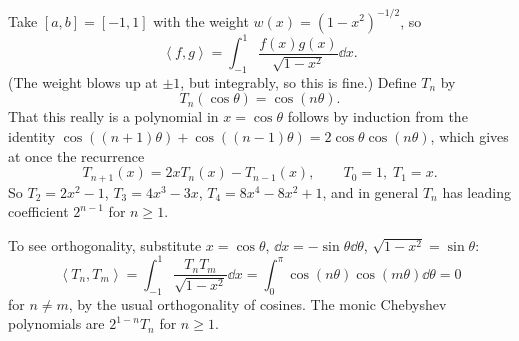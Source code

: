 \documentclass[a4paper]{scrartcl}
\newcommand{\ip}[2]{\left\langle #1, #2 \right\rangle}
\begin{document}
\begin{example}
  Take $[a,b] = [-1,1]$ with the weight $w(x) = (1-x^2)^{-1/2}$, so
  $$
  \ip{f}{g} = \int_{-1}^{1}\frac{f(x)g(x)}{\sqrt{1-x^2}}\dd x.
  $$
  (The weight blows up at $\pm 1$, but integrably, so this is fine.) Define $T_n$ by
  $$
  T_n(\cos\theta) = \cos(n\theta).
  $$
  That this really is a polynomial in $x = \cos\theta$ follows by induction from the identity $\cos((n+1)\theta) + \cos((n-1)\theta) = 2\cos\theta\cos(n\theta)$, which gives at once the recurrence
  $$
  T_{n+1}(x) = 2xT_n(x) - T_{n-1}(x), \qquad T_0 = 1, \; T_1 = x.
  $$
  So $T_2 = 2x^2 - 1$, $T_3 = 4x^3 - 3x$, $T_4 = 8x^4 - 8x^2 + 1$, and in general $T_n$ has leading coefficient $2^{n-1}$ for $n \geq 1$.

  To see orthogonality, substitute $x = \cos\theta$, $\dd x = -\sin\theta \dd\theta$, $\sqrt{1-x^2} = \sin\theta$:
  $$
  \ip{T_n}{T_m} = \int_{-1}^{1}\frac{T_n T_m}{\sqrt{1-x^2}}\dd x = \int_0^\pi \cos(n\theta)\cos(m\theta)\dd\theta = 0
  $$
  for $n \neq m$, by the usual orthogonality of cosines. The monic Chebyshev polynomials are $2^{1-n}T_n$ for $n \ge 1$.
\end{example}
\end{document}
